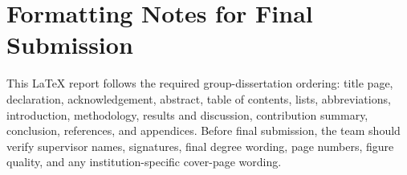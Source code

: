 \documentclass[12pt,a4paper]{report}
\begin{document}
\chapter{Formatting Notes for Final Submission}
This LaTeX report follows the required group-dissertation ordering: title page, declaration, acknowledgement, abstract, table of contents, lists, abbreviations, introduction, methodology, results and discussion, contribution summary, conclusion, references, and appendices. Before final submission, the team should verify supervisor names, signatures, final degree wording, page numbers, figure quality, and any institution-specific cover-page wording.
\end{document}
